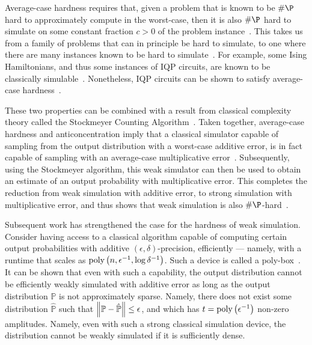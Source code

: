 Average-case hardness requires that, given a problem that is known to be $\#\P$ hard to approximately compute in the worst-case, then it is also $\#\P$ hard to simulate on some constant fraction $c>0$ of the problem instance~\cite{Bremner2016}. This takes us from a family of problems that can in principle be hard to simulate, to one where there are many instances known to be hard to simulate~\cite{Harrow2017}. For example, some Ising Hamiltonians, and thus some instances of IQP circuits, are known to be classically simulable~\cite{Fujii2017}. Nonetheless, IQP circuits can be shown to satisfy average-case hardness~\cite{Bremner2016}.\par
These two properties can be combined with a result from classical complexity theory called the Stockmeyer Counting Algorithm~\cite{Stockmeyer1985}. Taken together, average-case hardness and anticoncentration imply that a classical simulator capable of sampling from the output distribution with a worst-case additive error, is in fact capable of sampling with an average-case multiplicative error~\cite{Bremner2016}. Subsequently, using the Stockmeyer algorithm, this weak simulator can then be used to obtain an estimate of an output probability with multiplicative error. This completes the reduction from weak simulation with additive error, to strong simulation with multiplicative error, and thus shows that weak simulation is also $\#\P$-hard~\cite{Bremner2016}.\par
Subsequent work has strengthened the case for the hardness of weak simulation. Consider having access to a classical algorithm capable of computing certain output probabilities with additive $\left(\epsilon,\delta\right)$-precision, efficiently --- namely, with a runtime that scales as $\text{poly}\left(n,\epsilon^{-1},\log\delta^{-1}\right)$. Such a device is called a poly-box~\cite{Pashayan2017}. It can be shown that even with such a capability, the output distribution cannot be efficiently weakly simulated with additive error as long as the output distribution $\mathbb{P}$ is not approximately sparse. Namely, there does not exist some distribution $\hat{\mathbb{P}}$ such that $\norm{\mathbb{P}-\mathbb{\hat{P}}}\leq \epsilon$, and which has $t=\text{poly}\left(\epsilon^{-1}\right)$ non-zero amplitudes. Namely, even with such a strong classical simulation device, the distribution cannot be weakly simulated if it is sufficiently dense.

